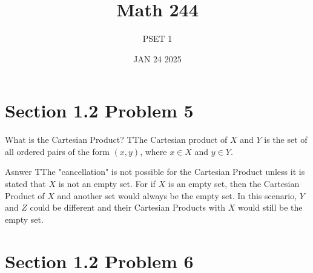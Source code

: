 \documentclass{report}
\title{\Huge{Math 244}}
\author{\huge{PSET 1}}
\date{JAN 24 2025}
\begin{document}
\maketitle
\newpage%
\tableofcontents
\pagebreak

\section*{Section 1.2 Problem 5}


\begin{RemarkWithLily}{What is the Cartesian Product?}
    TThe Cartesian product of $X$ and $Y$ is the set of all ordered pairs of the form $(x,y)$, where $x \in X$ and $y \in Y$. 
\end{RemarkWithLily}

\begin{RemarkWithLily}{Asnwer}
    TThe "cancellation" is not possible for the Cartesian Product unless it is stated that $X$ is not an empty set. For if $X$ is an empty set, then the Cartesian Product of $X$ and 
    another set would always be the empty set. In this scenario, $Y$ and $Z$ could be different and their Cartesian Products with $X$ would still be the empty set.
\end{RemarkWithLily}

\section*{Section 1.2 Problem 6}
\end{document}

